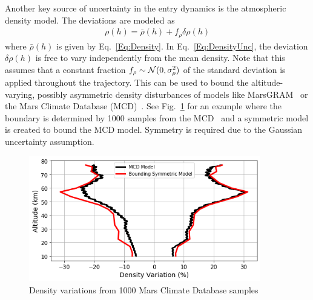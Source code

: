 Another key source of uncertainty in the entry dynamics is the atmospheric density model. The deviations are modeled as 
\begin{align}
	\rho(h) = \bar{\rho}(h) + f_{\rho}\delta\rho(h) \label{Eq:DensityUnc}
\end{align}
where $\bar{\rho}(h)$ is given by Eq.~\eqref{Eq:Density}. In Eq.~\eqref{Eq:DensityUnc}, the deviation $\delta\rho(h)$ is free to vary independently from the mean density. Note that this assumes that a constant fraction $f_{\rho}\sim\mathcal{N}(0, \sigma^2_{\rho})$ of the standard deviation is applied throughout the trajectory. This can be used to bound the altitude-varying, possibly asymmetric density disturbances of models like MarsGRAM~\cite{MarsGRAM2010} or the Mars Climate Database (MCD)~\cite{MarsClimateDB}. See Fig.~\ref{Fig:DensityVariations} for an example where the boundary is determined by 1000 samples from the MCD~\cite{GuangfeiDissertation} and a symmetric model is created to bound the MCD model. Symmetry is required due to the Gaussian uncertainty assumption. 
\begin{figure}[h!]
	\centering
	\includegraphics[width=0.9\textwidth]{Images/DensityVariations}
	\caption{Density variations from 1000 Mars Climate Database samples}
	\label{Fig:DensityVariations}
\end{figure} 

